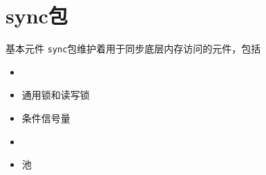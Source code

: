 \section{sync包}
  \begin{frame}{基本元件}
  \texttt{sync}包维护着用于同步底层内存访问的元件，包括
  \begin{itemize}
      \item \WaitGroup
      \item 通用锁\Mutex 和读写锁\RWMutex
      \item 条件信号量\Cond
      \item \Once
      \item 池\Pool
  \end{itemize} 
  \end{frame}